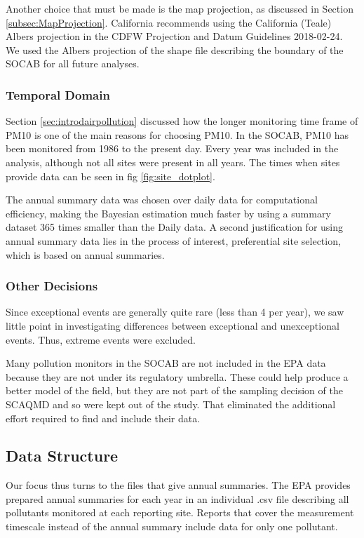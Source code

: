 \documentclass{article}
\begin{document}
Another choice that must be made is the map projection, as discussed in Section \ref{subsec:MapProjection}.  California recommends using the California (Teale) Albers projection in the CDFW Projection and Datum Guidelines 2018-02-24.  We used the Albers projection of the shape file describing the boundary of the \ac{SOCAB} for all future analyses.


\subsubsection*{Temporal Domain}
\label{subsubsec:tempdomain}
Section \ref{sec:introdairpollution} discussed how the longer monitoring time frame of \ac{PM10} is one of the main reasons for choosing \ac{PM10}.  In the \ac{SOCAB}, \ac{PM10} has been monitored from 1986 to the present day.  Every year was included in the analysis, although not all sites were present in all years.   The times when sites provide data can be seen in fig \ref{fig:site_dotplot}.

The annual summary data was chosen over daily data for
computational efficiency, making the Bayesian estimation much faster by using a summary dataset 365 times smaller than the Daily data.  A second justification for using annual summary data lies in the process of interest, preferential site selection, which is based on annual summaries.

\subsubsection*{Other Decisions}
\label{subsubsec:otherdecisions}
Since exceptional events are generally quite rare (less than 4 per year), we saw little point in investigating differences between exceptional and unexceptional events. Thus, extreme events were excluded.

Many pollution monitors in the \ac{SOCAB} are not included in the \ac{EPA} data because they are not under its regulatory umbrella.  These could help 
produce a better model of the field, but they are not part of the sampling decision of the \ac{SCAQMD} and so were kept out of the study. That eliminated the additional effort required to find and include their data.

\subsection{Data Structure}
\label{subsec:datastructure}
Our focus thus turns to the files that give annual summaries.
The \ac{EPA} provides prepared annual summaries for each year in an individual .csv file describing all pollutants monitored at each reporting site.  Reports that cover the measurement timescale instead of the annual summary include data for only one pollutant.  
\end{document}
